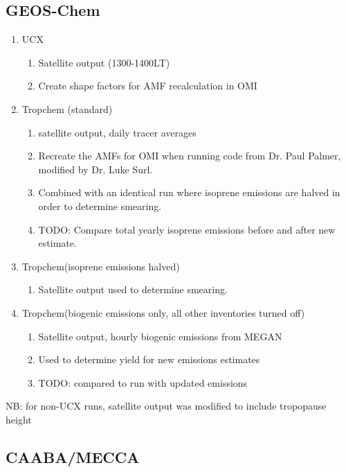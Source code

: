  \subsection{GEOS-Chem}
    \begin{enumerate}
      \item UCX 
      \begin{enumerate}
        \item Satellite output (1300-1400LT)
        \item Create shape factors for AMF recalculation in OMI
      \end{enumerate}
      
      \item Tropchem (standard)
      \begin{enumerate}
        \item satellite output, daily tracer averages
        \item Recreate the AMFs for OMI when running code from Dr. Paul Palmer, modified by Dr. Luke Surl.
        \item Combined with an identical run where isoprene emissions are halved in order to determine smearing.
        \item TODO: Compare total yearly isoprene emissions before and after new estimate.
      \end{enumerate}
    
      \item Tropchem(isoprene emissions halved)
      \begin{enumerate}
        \item Satellite output used to determine smearing.
      \end{enumerate}
    
      \item Tropchem(biogenic emissions only, all other inventories turned off)
      \begin{enumerate}
        \item Satellite output, hourly biogenic emissions from MEGAN
        \item Used to determine yield for new emissions estimates
        \item TODO: compared to run with updated emissions
      \end{enumerate}
    \end{enumerate}
    NB: for non-UCX runs, satellite output was modified to include tropopause height
  \subsection{CAABA/MECCA}
  
